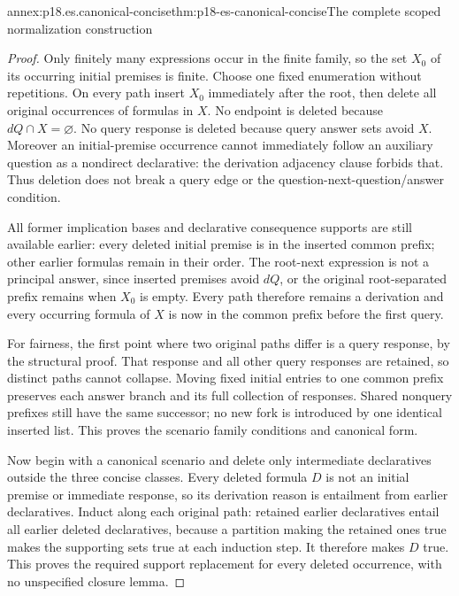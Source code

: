 \begin{annexitem}{annex:p18.es.canonical-concise}{thm:p18-es-canonical-concise}{The complete scoped normalization construction}
\begin{proof}
Only finitely many expressions occur in the finite family, so the set \(X_0\)
of its occurring initial premises is finite. Choose one fixed enumeration
without repetitions. On every path insert \(X_0\) immediately after the
root, then delete all original occurrences of formulas in \(X\).
No endpoint is deleted because \(dQ\cap X=\varnothing\). No query response
is deleted because query answer sets avoid \(X\). Moreover an initial-premise
occurrence cannot immediately follow an auxiliary question as a nondirect
declarative: the derivation adjacency clause forbids that. Thus deletion
does not break a query edge or the question-next-question/answer condition.

All former implication bases and declarative consequence supports are still
available earlier: every deleted initial premise is in the inserted common
prefix; other earlier formulas remain in their order. The root-next expression
is not a principal answer, since inserted premises avoid \(dQ\), or the
original root-separated prefix remains when \(X_0\) is empty. Every path
therefore remains a derivation and every occurring formula of \(X\) is now
in the common prefix before the first query.

For fairness, the first point where two original paths differ is a query
response, by the structural proof. That response and all other query
responses are retained, so distinct paths cannot collapse. Moving fixed
initial entries to one common prefix preserves each answer branch and its
full collection of responses. Shared nonquery prefixes still have the same
successor; no new fork is introduced by one identical inserted list. This
proves the scenario family conditions and canonical form.

Now begin with a canonical scenario and delete only intermediate declaratives
outside the three concise classes. Every deleted formula \(D\) is not an
initial premise or immediate response, so its derivation reason is entailment
from earlier declaratives. Induct along each original path: retained earlier
declaratives entail all earlier deleted declaratives, because a partition
making the retained ones true makes the supporting sets true at each induction
step. It therefore makes \(D\) true. This proves the required support
replacement for every deleted occurrence, with no unspecified closure lemma.


\end{proof}
\end{annexitem}
